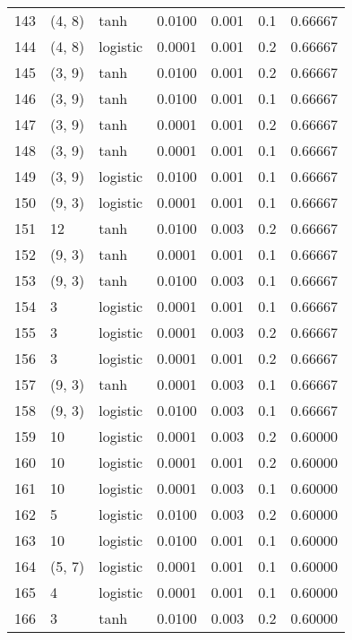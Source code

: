 \begin{tabular}{lllrrrr}
143 &      (4, 8) &      tanh &  0.0100 &  0.001 &  0.1 &   0.66667 \\
144 &      (4, 8) &  logistic &  0.0001 &  0.001 &  0.2 &   0.66667 \\
145 &      (3, 9) &      tanh &  0.0100 &  0.001 &  0.2 &   0.66667 \\
146 &      (3, 9) &      tanh &  0.0100 &  0.001 &  0.1 &   0.66667 \\
147 &      (3, 9) &      tanh &  0.0001 &  0.001 &  0.2 &   0.66667 \\
148 &      (3, 9) &      tanh &  0.0001 &  0.001 &  0.1 &   0.66667 \\
149 &      (3, 9) &  logistic &  0.0100 &  0.001 &  0.1 &   0.66667 \\
150 &      (9, 3) &  logistic &  0.0001 &  0.001 &  0.1 &   0.66667 \\
151 &          12 &      tanh &  0.0100 &  0.003 &  0.2 &   0.66667 \\
152 &      (9, 3) &      tanh &  0.0001 &  0.001 &  0.1 &   0.66667 \\
153 &      (9, 3) &      tanh &  0.0100 &  0.003 &  0.1 &   0.66667 \\
154 &           3 &  logistic &  0.0001 &  0.001 &  0.1 &   0.66667 \\
155 &           3 &  logistic &  0.0001 &  0.003 &  0.2 &   0.66667 \\
156 &           3 &  logistic &  0.0001 &  0.001 &  0.2 &   0.66667 \\
157 &      (9, 3) &      tanh &  0.0001 &  0.003 &  0.1 &   0.66667 \\
158 &      (9, 3) &  logistic &  0.0100 &  0.003 &  0.1 &   0.66667 \\
159 &          10 &  logistic &  0.0001 &  0.003 &  0.2 &   0.60000 \\
160 &          10 &  logistic &  0.0001 &  0.001 &  0.2 &   0.60000 \\
161 &          10 &  logistic &  0.0001 &  0.003 &  0.1 &   0.60000 \\
162 &           5 &  logistic &  0.0100 &  0.003 &  0.2 &   0.60000 \\
163 &          10 &  logistic &  0.0100 &  0.001 &  0.1 &   0.60000 \\
164 &      (5, 7) &  logistic &  0.0001 &  0.001 &  0.1 &   0.60000 \\
165 &           4 &  logistic &  0.0001 &  0.001 &  0.1 &   0.60000 \\
166 &           3 &      tanh &  0.0100 &  0.003 &  0.2 &   0.60000 \\

\end{tabular}
